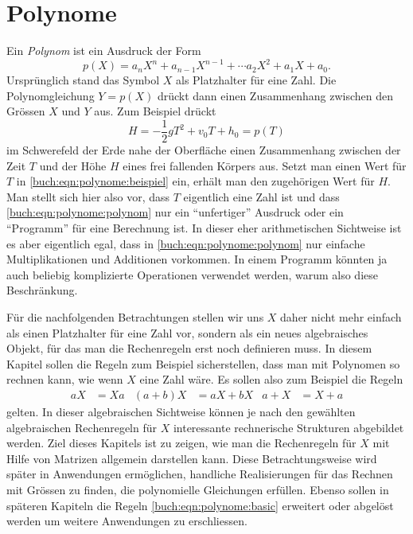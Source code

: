%
%
%
\chapter{Polynome
\label{buch:chapter:polynome}}
Ein {\em Polynom} ist ein Ausdruck der Form
%
\begin{equation}
p(X) = a_nX^n+a_{n-1}X^{n-1} + \cdots a_2X^2 + a_1X + a_0.
\label{buch:eqn:polynome:polynom}
\end{equation}
Ursprünglich stand das Symbol $X$ als Platzhalter für eine Zahl.
Die Polynomgleichung $Y=p(X)$ drückt dann einen Zusammenhang zwischen
den Grössen $X$ und $Y$ aus.
Zum Beispiel drückt
\begin{equation}
H = -\frac12gT^2 + v_0T +h_0 = p(T)
\label{buch:eqn:polynome:beispiel}
\end{equation}
im Schwerefeld der Erde nahe der Oberfläche einen Zusammenhang
zwischen der Zeit $T$ und der Höhe $H$ eines frei fallenden Körpers aus.
Setzt man einen Wert für $T$ in \eqref{buch:eqn:polynome:beispiel} ein,
erhält man den zugehörigen Wert für $H$.
Man stellt sich hier also vor, dass $T$ eigentlich eine Zahl ist und dass
\eqref{buch:eqn:polynome:polynom}
nur ein ``unfertiger'' Ausdruck oder ein ``Programm'' für eine Berechnung
ist.
In dieser eher arithmetischen Sichtweise ist es aber eigentlich egal, dass in
%
\eqref{buch:eqn:polynome:polynom} nur einfache Multiplikationen und
Additionen vorkommen.
In einem Programm könnten ja auch beliebig komplizierte Operationen
verwendet werden, warum also diese Beschränkung.

Für die nachfolgenden Betrachtungen stellen wir uns $X$ daher nicht
mehr einfach als einen Platzhalter für eine Zahl vor, sondern als ein neues
algebraisches Objekt, für das man die Rechenregeln erst noch definieren muss.
In diesem Kapitel sollen die Regeln zum Beispiel sicherstellen,
dass man mit Polynomen so rechnen kann, wie wenn $X$ eine Zahl wäre.
Es sollen also zum Beispiel die Regeln
\begin{align}
aX&=Xa
&
(a+b)X&=aX+bX
&
a+X &= X+a
\label{buch:eqn:polynome:basic}
\end{align}
gelten.
In dieser algebraischen Sichtweise können je nach den gewählten algebraischen
Rechenregeln für $X$ interessante rechnerische Strukturen abgebildet werden.
%
Ziel dieses Kapitels ist zu zeigen, wie man die Rechenregeln für $X$
mit Hilfe von Matrizen allgemein darstellen kann.
Diese Betrachtungsweise wird später in Anwendungen ermöglichen,
handliche Realisierungen für das Rechnen mit Grössen zu finden,
die polynomielle Gleichungen erfüllen.
Ebenso sollen in späteren Kapiteln die Regeln
\eqref{buch:eqn:polynome:basic}
erweitert oder abgelöst werden um weitere Anwendungen zu erschliessen.

